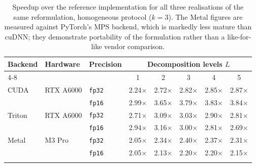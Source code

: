 \begin{table}[t]
\centering
\caption{Speedup over the reference implementation for all three realisations of the same reformulation, homogeneous protocol ($k{=}3$). The Metal figures are measured against PyTorch's MPS backend, which is markedly less mature than cuDNN; they demonstrate portability of the formulation rather than a like-for-like vendor comparison.}
\label{tab:backends}
\begin{tabular}{lllccccc}
\toprule
\multirow{2}{*}{Backend} & \multirow{2}{*}{Hardware} & \multirow{2}{*}{Precision} & \multicolumn{5}{c}{Decomposition levels $L$} \\
\cmidrule(lr){4-8}
 & & & 1 & 2 & 3 & 4 & 5 \\
\midrule
CUDA & RTX A6000 & \texttt{fp32} & 2.24$\times$ & 2.72$\times$ & 2.82$\times$ & 2.85$\times$ & 2.87$\times$ \\
 &  & \texttt{fp16} & 2.99$\times$ & 3.65$\times$ & 3.79$\times$ & 3.83$\times$ & 3.84$\times$ \\
\addlinespace[2pt]
Triton & RTX A6000 & \texttt{fp32} & 2.71$\times$ & 3.09$\times$ & 3.03$\times$ & 2.90$\times$ & 2.81$\times$ \\
 &  & \texttt{fp16} & 2.94$\times$ & 3.16$\times$ & 3.00$\times$ & 2.81$\times$ & 2.69$\times$ \\
\addlinespace[2pt]
Metal & M3 Pro & \texttt{fp32} & 2.05$\times$ & 2.34$\times$ & 2.40$\times$ & 2.37$\times$ & 2.31$\times$ \\
 &  & \texttt{fp16} & 2.05$\times$ & 2.13$\times$ & 2.20$\times$ & 2.20$\times$ & 2.15$\times$ \\
\addlinespace[2pt]
\bottomrule
\end{tabular}
\end{table}
